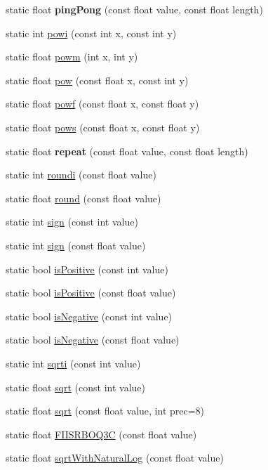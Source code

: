 \begin{DoxyCompactItemize}
\item 
\hypertarget{class_matth_a04ea1eb756abb1fa8bdec988e683dece}{}static float {\bfseries ping\+Pong} (const float value, const float length)\label{class_matth_a04ea1eb756abb1fa8bdec988e683dece}

\item 
static int \hyperlink{class_matth_af03a50b476584039c3cc3a0d0e3e9bd3}{powi} (const int x, const int y)
\item 
static float \hyperlink{class_matth_a7954d1a0bb6c622a6f549c32d2433033}{powm} (int x, int y)
\item 
static float \hyperlink{class_matth_ac278215a09c78414ba39aa272467daaa}{pow} (const float x, const int y)
\item 
static float \hyperlink{class_matth_a380eeb8581001889bdfe4ee92c37078a}{powf} (const float x, const float y)
\item 
static float \hyperlink{class_matth_a5e08b96ca233f47eb8d032f5047699e6}{pows} (const float x, const float y)
\item 
\hypertarget{class_matth_ab23724db6cbd9e4a87810de3a9b0b257}{}static float {\bfseries repeat} (const float value, const float length)\label{class_matth_ab23724db6cbd9e4a87810de3a9b0b257}

\item 
static int \hyperlink{class_matth_a7b01f3385d703849bb2fa5455240ee72}{roundi} (const float value)
\item 
static float \hyperlink{class_matth_a087cbb3b6860ceb84cb18229f8e650e8}{round} (const float value)
\item 
static int \hyperlink{class_matth_ae80bf23688c9ab836d0efe34353015b8}{sign} (const int value)
\item 
static int \hyperlink{class_matth_ac023116fb53d5ae66dd98c267ffafcf2}{sign} (const float value)
\item 
static bool \hyperlink{class_matth_adc580377dc220725fca144b52658e90b}{is\+Positive} (const int value)
\item 
static bool \hyperlink{class_matth_a4bcb12e944d790f1e5279a2a67216b9c}{is\+Positive} (const float value)
\item 
static bool \hyperlink{class_matth_a0b74da83e267dd3dabab08c698d945b9}{is\+Negative} (const int value)
\item 
static bool \hyperlink{class_matth_abcf0f572e8d5b6ff2e7dcacb7b45f171}{is\+Negative} (const float value)
\item 
static int \hyperlink{class_matth_ab274e2dde5096d43ab5255c74bf4cab1}{sqrti} (const int value)
\item 
static float \hyperlink{class_matth_a79c7e3aac560ddf3bdc454e2dd00997d}{sqrt} (const int value)
\item 
static float \hyperlink{class_matth_aa44ccf6d43d7b3e7e37988b87fd29d23}{sqrt} (const float value, int prec=8)
\item 
static float \hyperlink{class_matth_a4ee96c6fa0a8a7e0ed3ea73219104418}{F\+I\+I\+S\+R\+B\+O\+Q3\+C} (const float value)
\item 
static float \hyperlink{class_matth_acea19471a1994e0012ef8b67d450cd65}{sqrt\+With\+Natural\+Log} (const float value)
\end{DoxyCompactItemize}



